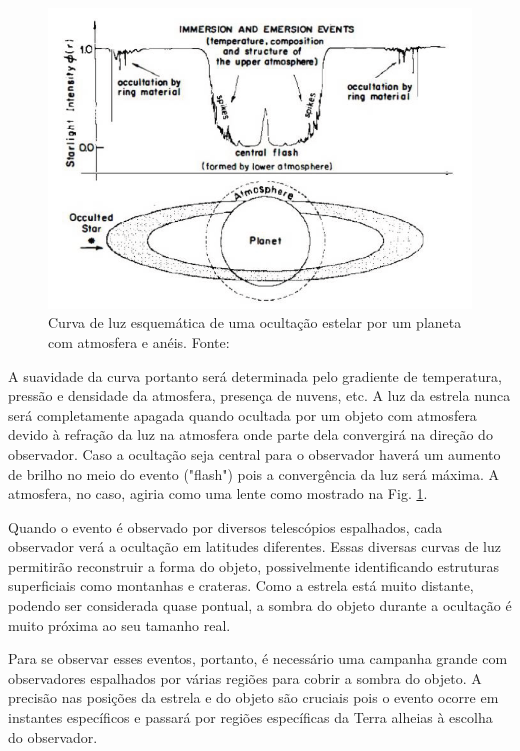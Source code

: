 \documentclass[12pt,a4paper]{monografia}
\begin{document}
\begin{figure}[h]
\begin{centering}
\includegraphics[scale=0.75]{figuras/stellarocc.png} 
\caption{Curva de luz esquemática de uma ocultação estelar por um planeta com atmosfera e anéis. Fonte: \cite{Elliot1979}}
\label{Fig: occ-scheme}
\end{centering} 
\end{figure}

A suavidade da curva portanto será determinada pelo gradiente de temperatura, pressão e densidade da atmosfera, presença de nuvens, etc. A luz da estrela nunca será completamente apagada quando ocultada por um objeto com atmosfera devido à refração da luz na atmosfera onde parte dela convergirá na direção do observador. Caso a ocultação seja central para o observador haverá um aumento de brilho no meio do evento ("flash") pois a convergência da luz será máxima. A atmosfera, no caso, agiria como uma lente como mostrado na Fig. \ref{Fig: occ-scheme}.

Quando o evento é observado por diversos telescópios espalhados, cada observador verá a ocultação em latitudes diferentes. Essas diversas curvas de luz permitirão reconstruir a forma do objeto, possivelmente identificando estruturas superficiais como montanhas e crateras. Como a estrela está muito distante, podendo ser considerada quase pontual, a sombra do objeto durante a ocultação é muito próxima ao seu tamanho real.

Para se observar esses eventos, portanto, é necessário uma campanha grande com observadores espalhados por várias regiões para cobrir a sombra do objeto. A precisão nas posições da estrela e do objeto são cruciais pois o evento ocorre em instantes específicos e passará por regiões específicas da Terra alheias à escolha do observador.
\end{document}
